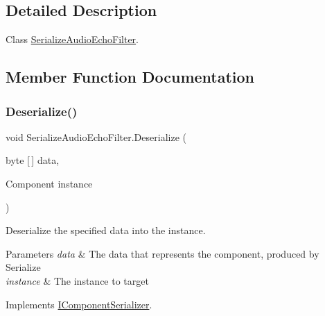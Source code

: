 \subsection{Detailed Description}
Class \hyperlink{class_serialize_audio_echo_filter}{Serialize\+Audio\+Echo\+Filter}. 



\subsection{Member Function Documentation}
\mbox{\label{class_serialize_audio_echo_filter_ad5beda12b5d39b678ce291ee1c13374c}} 
\subsubsection{\texorpdfstring{Deserialize()}{Deserialize()}}
{\footnotesize\ttfamily void Serialize\+Audio\+Echo\+Filter.\+Deserialize (\begin{DoxyParamCaption}\item[{byte \mbox{[}$\,$\mbox{]}}]{data,  }\item[{Component}]{instance }\end{DoxyParamCaption})\hspace{0.3cm}{\ttfamily [inline]}}



Deserialize the specified data into the instance. 


\begin{DoxyParams}{Parameters}
{\em data} & The data that represents the component, produced by Serialize\\
\hline
{\em instance} & The instance to target\\
\hline
\end{DoxyParams}


Implements \hyperlink{interface_i_component_serializer_a4cc366a5c78b33d47a90c209d8fed883}{I\+Component\+Serializer}.

\mbox{\label{class_serialize_audio_echo_filter_a05a44375abc89e383547960120fb55e6}} 
